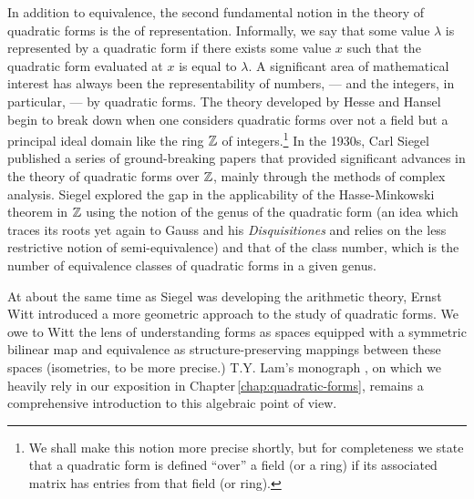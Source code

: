 In addition to equivalence, the second fundamental notion in the theory of
quadratic forms is the of representation. Informally, we say that some value
\(\lambda\) is represented by a quadratic form if there exists some value \(x\)
such that the quadratic form evaluated at \(x\) is equal to \(\lambda\). A
significant area of mathematical interest has always been the representability
of numbers, --- and the integers, in particular, --- by quadratic forms. The
theory developed by Hesse and Hansel begin to break down when one considers
quadratic forms over not a field but a principal ideal domain like the ring
\(\mathbb{Z}\) of integers.\footnote{We shall make this notion more precise
shortly, but for completeness we state that a quadratic form is defined ``over''
a field (or a ring) if its associated matrix has entries from that field (or
ring).} In the 1930s, Carl Siegel published a series of ground-breaking papers
that provided significant advances in the theory of quadratic forms over
\(\mathbb{Z}\), mainly through the methods of complex analysis. Siegel explored
the gap in the applicability of the Hasse-Minkowski theorem in \(\mathbb{Z}\)
using the notion of the genus of the quadratic form (an idea which traces its
roots yet again to Gauss and his \emph{Disquisitiones} and relies on the less
restrictive notion of semi-equivalence) and that of the class number, which is
the number of equivalence classes of quadratic forms in a given genus.
\cite{gerstein2008basic}

At about the same time as Siegel was developing the arithmetic theory, Ernst
Witt introduced a more geometric approach to the study of quadratic forms. We
owe to Witt the lens of understanding forms as spaces equipped with a symmetric
bilinear map and equivalence as structure-preserving mappings between these
spaces (isometries, to be more precise.) T.Y. Lam's monograph
\cite{lam1973quadratic}, on which we heavily rely in our exposition in
Chapter\,\ref{chap:quadratic-forms}, remains a comprehensive introduction to
this algebraic point of view.